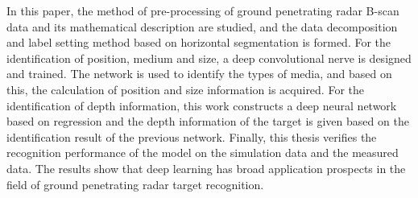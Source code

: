 \begin{englishabstract}
	In this paper, the method of pre-processing of ground penetrating radar B-scan data and its mathematical description are studied, and the data decomposition and label setting method based on horizontal segmentation is formed. For the identification of position, medium and size, a deep convolutional nerve is designed and trained. The network is used to identify the types of media, and based on this, the calculation of position and size information is acquired. For the identification of depth information, this work constructs a deep neural network based on regression and the depth information of the target is given based on the identification result of the previous network. Finally, this thesis verifies the recognition performance of the model on the simulation data and the measured data. The results show that deep learning has broad application prospects in the field of ground penetrating radar target recognition.
	
\end{englishabstract}


